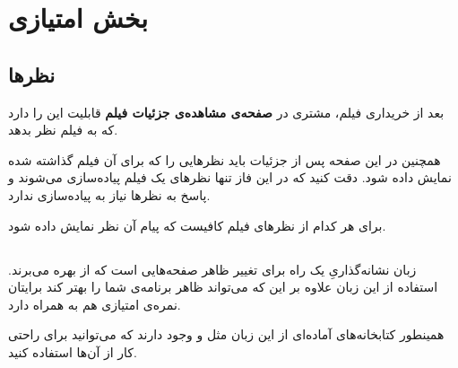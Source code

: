 \documentclass{utap}
\begin{document}
    
    
    
    
    
    \section{بخش امتیازی}
    	\subsection{نظر‌ها}
    	بعد از خریداری فیلم، مشتری در  
    	\textbf{صفحه‌ی مشاهده‌ی جزئیات فیلم}
    	قابلیت این را دارد که به فیلم نظر بدهد. 
    	
    	همچنین در این صفحه پس از جزئیات باید نظرهایی را که برای آن فیلم گذاشته شده نمایش داده شود. دقت کنید که در این فاز تنها نظر‌های یک فیلم پیاده‌سازی می‌شوند و پاسخ به نظر‌ها نیاز به پیاده‌سازی ندارد.
    	
    	     برای هر کدام از نظر‌های فیلم کافیست که پیام آن نظر‌ نمایش داده شود.
    	
        \subsection{}
    زبان نشانه‌گذاریِ 
 یک راه برای تغییر ظاهر صفحه‌هایی است که از  بهره می‌برند. استفاده از این زبان علاوه بر این که می‌تواند ظاهر برنامه‌ی شما را بهتر کند برایتان نمره‌ی امتیازی هم به همراه دارد.
 
 همینطور کتابخانه‌های آماده‌ای از این زبان مثل
  و
  وجود دارند که می‌توانید برای راحتی کار از آن‌ها استفاده کنید. 
 
 
 
 
\end{document}

